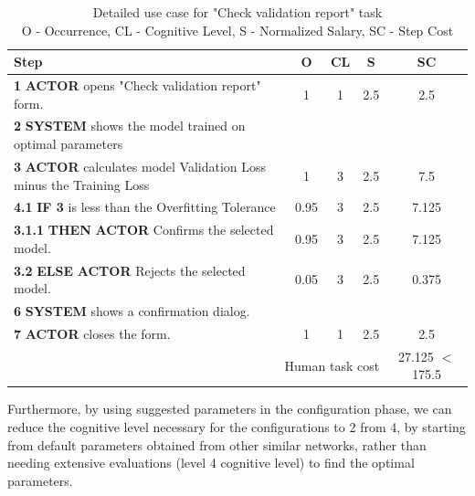 \begin{table}[H]
\centering
\begin{tabularx}{\textwidth}{|X|c|c|c|c|}
\hline
\textbf{Step} & \textbf{O} & \textbf{CL} & \textbf{S} & \textbf{SC} \\
\hline
\textbf{1} \textbf{ACTOR} opens "Check validation report" form. & 1 & 1 & 2.5 & 2.5 \\
\hline
\textbf{2} \textbf{SYSTEM} shows the model trained on optimal parameters & & & & \\
\hline
\textbf{3} \textbf{ACTOR} calculates model Validation Loss minus the Training Loss & 1 & 3 & 2.5 & 7.5 \\
\hline
\textbf{4.1} \textbf{IF 3} is less than the Overfitting Tolerance & 0.95 & 3 & 2.5 & 7.125 \\
\hline
\textbf{3.1.1} \textbf{THEN} \textbf{ACTOR} Confirms the selected model. & 0.95 & 3 & 2.5 & 7.125 \\
\hline
\textbf{3.2} \textbf{ELSE} \textbf{ACTOR} Rejects the selected model. & 0.05 & 3 & 2.5 & 0.375 \\
\hline
\textbf{6} \textbf{SYSTEM} shows a confirmation dialog. & & & & \\
\hline
\textbf{7} \textbf{ACTOR} closes the form. & 1 & 1 & 2.5 & 2.5 \\
\hline
\multicolumn{4}{|r|}{Human task cost} & 27.125 $ < $ 175.5 \\
\hline
\end{tabularx}
\caption{Detailed use case for "Check validation report" task\\ 
O - Occurrence, CL - Cognitive Level, S - Normalized Salary, SC - Step Cost}
\label{table:to_be_check_validation_report}
\end{table}

Furthermore, by using suggested parameters in the configuration phase, we can reduce the cognitive level necessary for the configurations to 2 from 4, by starting from default parameters obtained from other similar networks, rather than needing extensive evaluations (level 4 cognitive level) to find the optimal parameters.

